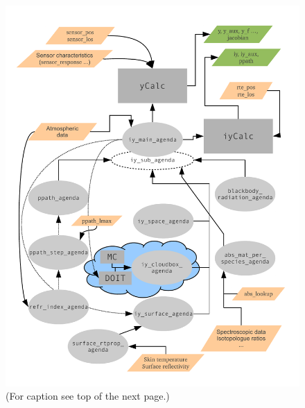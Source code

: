 \begin{figure}[p]
 \begin{center}
  \includegraphics*[clip,trim=25 30 25 40,width=0.99\hsize]{ycalc_flow}\\
  {\small (For caption see top of the next page.)}
 \end{center}
\end{figure}

